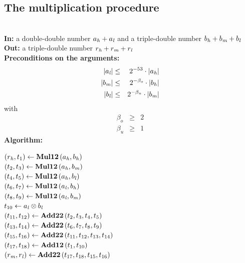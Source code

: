 \subsection{The multiplication procedure \MulDTT}
\begin{algorithm}[\MulDTT] \label{mulDTTref} ~ \\
{\bf In:} a double-double number $a_{\mathit{h}} + a_{\mathit{l}}$  and a triple-double number $b_{\mathit{h}} + b_{\mathit{m}} + b_{\mathit{l}}$ \\
{\bf Out:} a triple-double number $r_{\mathit{h}} + r_{\mathit{m}} + r_{\mathit{l}}$ \\
{\bf Preconditions on the arguments:}
\begin{eqnarray*}
\left \vert a_{\mathit{l}} \right \vert & \leq & 2^{-53} \cdot \left \vert a_{\mathit{h}} \right \vert \\
\left \vert b_{\mathit{m}} \right \vert & \leq & 2^{-\beta_o} \cdot \left \vert b_{\mathit{h}} \right \vert \\
\left \vert b_{\mathit{l}} \right \vert & \leq & 2^{-\beta_u} \cdot \left \vert b_{\mathit{m}} \right \vert 
\end{eqnarray*}
with
\begin{eqnarray*}
\beta_o & \geq & 2 \\
\beta_u & \geq & 1 
\end{eqnarray*}
{\bf Algorithm:} \\
\begin{center}
\begin{minipage}[b]{60mm}
$\left( r_{\mathit{h}}, t_1 \right) \gets \mathbf{Mul12}\left( a_{\mathit{h}}, b_{\mathit{h}} \right)$ \\
$\left( t_2, t_3 \right) \gets \mathbf{Mul12}\left( a_{\mathit{h}}, b_{\mathit{m}} \right)$ \\
$\left( t_4, t_5 \right) \gets \mathbf{Mul12}\left( a_{\mathit{h}}, b_{\mathit{l}} \right)$ \\
$\left( t_6, t_7 \right) \gets \mathbf{Mul12}\left( a_{\mathit{l}}, b_{\mathit{h}} \right)$ \\
$\left( t_8, t_9 \right) \gets \mathbf{Mul12}\left( a_{\mathit{l}}, b_{\mathit{m}} \right)$ \\
$t_{10} \gets a_{\mathit{l}} \otimes b_{\mathit{l}}$ \\
$\left( t_{11}, t_{12} \right) \gets \mathbf{Add22}\left( t_2, t_3, t_4, t_5 \right)$ \\
$\left( t_{13}, t_{14} \right) \gets \mathbf{Add22}\left( t_6, t_7, t_8, t_9 \right)$ \\
$\left( t_{15}, t_{16} \right) \gets \mathbf{Add22}\left( t_{11}, t_{12}, t_{13}, t_{14} \right)$ \\
$\left( t_{17}, t_{18} \right) \gets \mathbf{Add12}\left( t_1, t_{10} \right)$ \\
$\left( r_{\mathit{m}}, r_{\mathit{l}} \right) \gets \mathbf{Add22}\left( t_{17}, t_{18}, t_{15}, t_{16} \right)$ \\
\end{minipage}
\end{center}
\end{algorithm}
